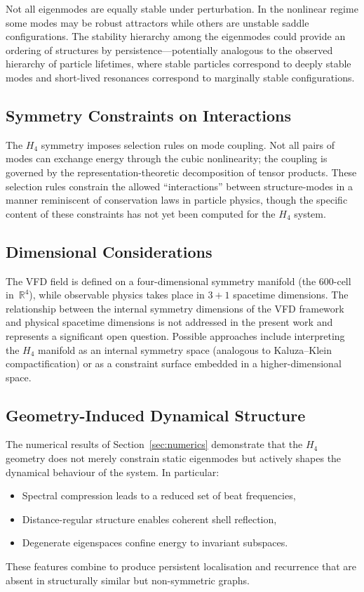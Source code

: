 \documentclass[12pt,a4paper]{article}
\newcommand{\Hfour}{H_4}
\newcommand{\R}{\mathbb{R}}
\begin{document}
Not all eigenmodes are equally stable under perturbation.  In the nonlinear
regime some modes may be robust attractors while others are unstable saddle
configurations.  The stability hierarchy among the eigenmodes could provide an
ordering of structures by persistence---potentially analogous to the observed
hierarchy of particle lifetimes, where stable particles correspond to deeply
stable modes and short-lived resonances correspond to marginally stable
configurations.

\subsection{Symmetry Constraints on Interactions}

The $\Hfour$ symmetry imposes selection rules on mode coupling.  Not all pairs
of modes can exchange energy through the cubic nonlinearity; the coupling is
governed by the representation-theoretic decomposition of tensor products.
These selection rules constrain the allowed ``interactions'' between
structure-modes in a manner reminiscent of conservation laws in particle
physics, though the specific content of these constraints has not yet been
computed for the $\Hfour$ system.

\subsection{Dimensional Considerations}

The VFD field is defined on a four-dimensional symmetry manifold (the 600-cell
in~$\R^4$), while observable physics takes place in $3{+}1$ spacetime
dimensions.  The relationship between the internal symmetry dimensions of the
VFD framework and physical spacetime dimensions is not addressed in the
present work and represents a significant open question.  Possible approaches
include interpreting the $\Hfour$ manifold as an internal symmetry space
(analogous to Kaluza--Klein compactification) or as a constraint surface
embedded in a higher-dimensional space.

\subsection{Geometry-Induced Dynamical Structure}

The numerical results of Section~\ref{sec:numerics} demonstrate that the
$\Hfour$ geometry does not merely constrain static eigenmodes but actively
shapes the dynamical behaviour of the system.  In particular:
\begin{itemize}[nosep]
\item Spectral compression leads to a reduced set of beat frequencies,
\item Distance-regular structure enables coherent shell reflection,
\item Degenerate eigenspaces confine energy to invariant subspaces.
\end{itemize}
These features combine to produce persistent localisation and recurrence
that are absent in structurally similar but non-symmetric graphs.
\end{document}

